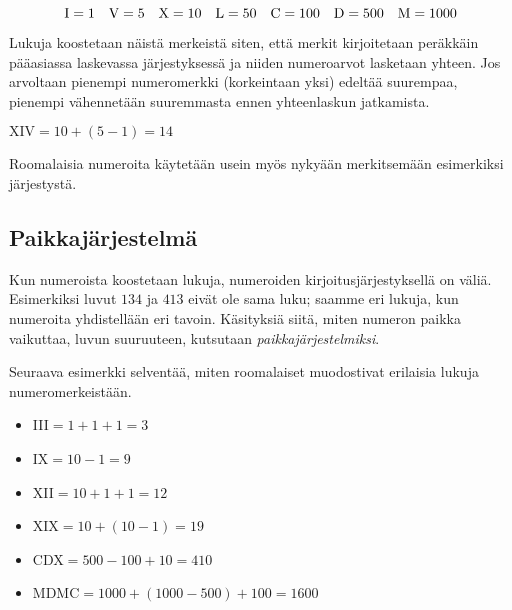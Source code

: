 \begin{equation*}
\rm I=1\quad
V=5\quad
X=10\quad
L=50\quad
C=100\quad
D=500\quad
M=1 000
\end{equation*}


Lukuja koostetaan näistä merkeistä siten, että merkit kirjoitetaan peräkkäin pääasiassa laskevassa järjestyksessä ja niiden numeroarvot lasketaan yhteen. Jos arvoltaan pienempi numeromerkki (korkeintaan yksi) edeltää suurempaa, pienempi vähennetään suuremmasta ennen yhteenlaskun jatkamista.

\begin{esimerkki}
$\text{XIV} = 10 + (5 - 1) = 14$
\end{esimerkki}

Roomalaisia numeroita käytetään usein myös nykyään merkitsemään esimerkiksi järjestystä.

\subsection*{Paikkajärjestelmä}

Kun numeroista koostetaan lukuja, numeroiden kirjoitusjärjestyksellä on väliä. Esimerkiksi luvut $134$ ja $413$ eivät ole sama luku; saamme eri lukuja, kun numeroita yhdistellään eri tavoin. Käsityksiä siitä, miten numeron paikka vaikuttaa, luvun suuruuteen, kutsutaan \emph{paikkajärjestelmiksi}.

Seuraava esimerkki selventää, miten roomalaiset muodostivat erilaisia lukuja numeromerkeistään.

\begin{esimerkki}
\begin{itemize}
\item III$=1+1+1=3$
\item IX$=10-1=9$
\item XII$=10+1+1=12$
\item XIX$=10+(10-1)=19$
\item CDX$=500-100+10=410$
\item MDMC$=1 000+(1 000-500)+100=1600$
\end{itemize}
\end{esimerkki}



